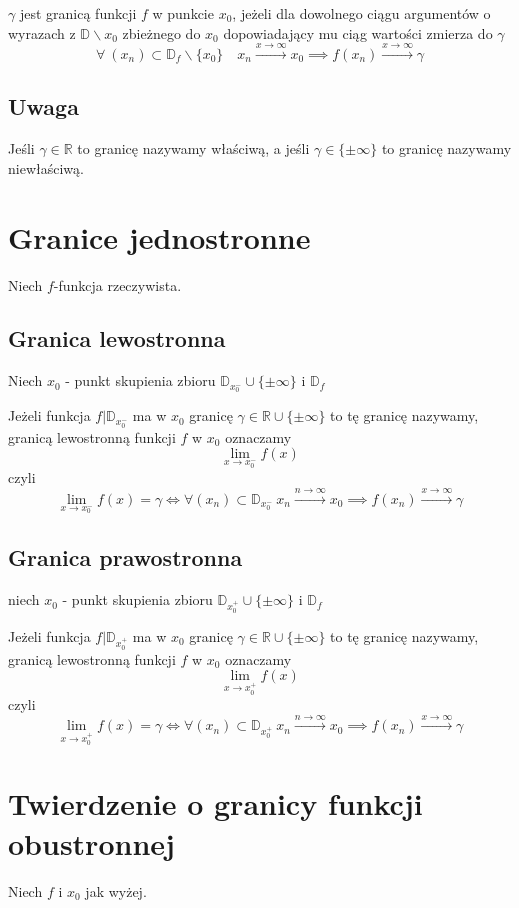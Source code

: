 \documentclass[11pt]{article}
\begin{document}
$\gamma$ jest granicą funkcji $f$ w punkcie $x_0$, jeżeli dla dowolnego ciągu argumentów o wyrazach z $ \mathbb{D} \backslash x_0$ zbieżnego do $x_0$ dopowiadający mu ciąg wartości zmierza do $\gamma$
$$ \forall\ (x_n) \subset \mathbb{D}_f \backslash \{x_0\} \quad x_n \xrightarrow{x \to \infty} x_0 \implies f(x_n) \xrightarrow{x \to \infty} \gamma$$
\subsection{Uwaga}
Jeśli $\gamma \in \mathbb{R}$ to granicę nazywamy właściwą, a jeśli $\gamma \in \{ \pm \infty \}$ to granicę nazywamy niewłaściwą. 

\section{Granice jednostronne}
Niech $f$-funkcja rzeczywista.
\subsection{Granica lewostronna}
Niech $x_0$ - punkt skupienia zbioru $\mathbb{D}_{x_0^-}  \cup \{ \pm \infty \}$ i $\mathbb{D}_f$

Jeżeli funkcja $f|\mathbb{D}_{x_0^-}$ ma w $x_0$ granicę $\gamma \in \mathbb{R} \cup \{ \pm \infty \}$ to tę granicę nazywamy, granicą lewostronną funkcji $f$ w $x_0$ oznaczamy $$ \lim_{x \to x_0^-}{f(x)}$$ czyli $$\lim_{x \to x_0^-}{f(x)} = \gamma \iff \forall (x_n) \subset \mathbb{D}_{x_0^-}\ x_n \xrightarrow{n \to \infty} x_0 \implies f(x_n) \xrightarrow{x \to \infty} \gamma$$
\subsection{Granica prawostronna}
niech $x_0$ - punkt skupienia zbioru $\mathbb{D}_{x_0^+}  \cup \{ \pm \infty \}$ i $\mathbb{D}_f$

Jeżeli funkcja $f|\mathbb{D}_{x_0^+}$ ma w $x_0$ granicę $\gamma \in \mathbb{R} \cup \{ \pm \infty \}$ to tę granicę nazywamy, granicą lewostronną funkcji $f$ w $x_0$ oznaczamy $$ \lim_{x \to x_0^+}{f(x)}$$ czyli $$\lim_{x \to x_0^+}{f(x)} = \gamma \iff \forall (x_n) \subset \mathbb{D}_{x_0^+}\ x_n \xrightarrow{n \to \infty} x_0 \implies f(x_n) \xrightarrow{x \to \infty} \gamma$$

\section{Twierdzenie o granicy funkcji obustronnej}
Niech $f$ i $x_0$ jak wyżej. 
\end{document}
